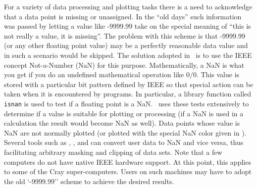 For a variety of data processing and plotting tasks there is a need to acknowledge that
a data point is missing or unassigned.  In the ``old days'' such information was passed
by letting a value like -9999.99 take on the special meaning of ``this is not really a
value, it is missing''.  The problem with this scheme is that -9999.99 (or any other
floating point value) may be a perfectly reasonable data value and in such a scenario
would be skipped.  The solution adopted in \GMT\ is to use the IEEE concept Not-a-Number
(NaN) for this purpose.  Mathematically, a NaN is what you get if you do an undefined
mathematical operation like $0/0$.  This value is stored with a particular bit pattern
defined by IEEE so that special action can be taken when it is encountered by programs.
In particular, a library function called \texttt{isnan} is used to test if a floating point
is a NaN.  \GMT\ uses these tests extensively to determine if a value is suitable for plotting
or processing (if a NaN is used in a calculation the result would become NaN as well).  Data points
whose value is NaN are not normally plotted (or plotted with the special NaN color given in
).  Several tools such as , , and
 can convert user data to NaN and vice versa, thus facilitating arbitrary
masking and clipping of data sets.  Note that a few computers do not have native IEEE hardware
support.  At this point, this applies to some of the Cray super-computers.  Users on such
machines may have to adopt the old `-9999.99'' scheme to achieve the desired results.
